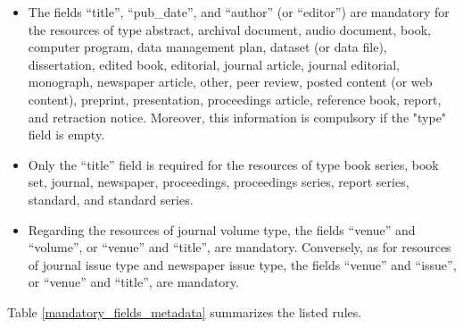 \documentclass{article}
\begin{document}
\begin{itemize}
    \item The fields ``title'', ``pub\_date'', and ``author'' (or ``editor'') are mandatory for the resources of type abstract, archival document, audio document, book, computer program, data management plan, dataset (or data file), dissertation, edited book, editorial, journal article, journal editorial, monograph, newspaper article, other, peer review, posted content (or web content), preprint, presentation, proceedings article, reference book, report, and retraction notice. Moreover, this information is compulsory if the "type" field is empty.
    \item Only the ``title'' field is required for the resources of type book series, book set, journal, newspaper, proceedings, proceedings series, report series, standard, and standard series.
    \item Regarding the resources of journal volume type, the fields ``venue'' and ``volume'', or ``venue'' and ``title'', are mandatory. Conversely, as for resources of journal issue type and newspaper issue type, the fields ``venue'' and ``issue'', or ``venue'' and ``title'', are mandatory.
\end{itemize}

Table \ref{mandatory_fields_metadata} summarizes the listed rules.
\end{document}
